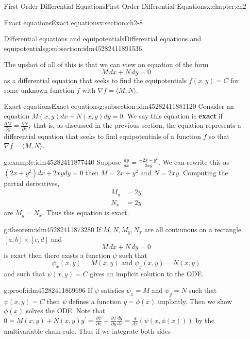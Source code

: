 \documentclass[oneside,10pt,]{book}
\newcommand{\terminology}[1]{\textbf{#1}}
\numberwithin{equation}{section}
\numberwithin{equation}{section}
\newcommand{\amp}{&}
\begin{document}
\begin{chapterptx}{First Order Differential Equations}{}{First Order Differential Equations}{}{}{x:chapter:ch2}
\begin{sectionptx}{Exact equations}{}{Exact equations}{}{}{x:section:ch2-8}
\begin{subsectionptx}{Differential equations and equipotentials}{}{Differential equations and equipotentials}{}{}{g:subsection:idm45282411891536}
\begin{equation*}
\end{equation*}
%
\par
The upshot of all of this is that we can view an equation of the form%
\begin{equation*}
M \, dx + N \, dy = 0
\end{equation*}
as a differential equation that seeks to find the equipotentials \(f(x,y) = C\) for some unknown function \(f\) with \(\nabla f = \langle M, N \rangle\).%
\end{subsectionptx}
%
%
\typeout{************************************************}
\typeout{************************************************}
%
\begin{subsectionptx}{Exact equations}{}{Exact equations}{}{}{g:subsection:idm45282411881120}
Consider an equation \(M(x,y)dx+N(x,y)dy=0.\) We say this equation is \terminology{exact} if \(\frac{\partial M}{\partial y}=\frac{\partial N}{\partial x};\) that is, as discussed in the previous section, the equation represents a differential equation that seeks to find equipotentials of a function \(f\) so that \(\nabla f = \langle M, N \rangle\).%
\begin{example}{}{g:example:idm45282411877440}%
Suppose \(\frac{dy}{dx}=\frac{-2x-y^{2}}{2xy}.\) We can rewrite this as \(\left(2x+y^{2}\right)dx+2xydy=0\) then \(M=2x+y^{2}\) and \(N=2xy\). Computing the partial derivatives,%
\begin{align*}
M_{y} \amp =2y\\
N_{x} \amp =2y
\end{align*}
are \(M_{y}=N_{x}\). Thus this equation is exact.\end{example}
\begin{theorem}{}{}{g:theorem:idm45282411873280}%
If \(M,N,M_{y},N_{x}\) are all continuous on a rectangle \([a,b]\times[c,d]\) and%
\begin{equation*}
M\,dx+N\,dy=0
\end{equation*}
is exact then there exists a function \(\psi\) such that%
\begin{equation*}
\psi_{x}(x,y)=M(x,y)\text{ and }\psi_{y}(x,y)=N(x,y)
\end{equation*}
and such that \(\psi(x,y)=C\) gives an implicit solution to the ODE.%
\end{theorem}
\begin{proofptx}{}{g:proof:idm45282411869696}
If \(\psi\) satisfies \(\psi_{x}=M\) and \(\psi_{y}=N\) such that \(\psi(x,y)=C\) then \(\psi\) defines a function \(y=\phi(x)\) implicitly. Then we show \(\phi(x)\) solves the ODE. Note that \(0=M(x,y)+N(x,y)y^{\prime}=\frac{\partial\psi}{\partial x}+\frac{\partial\psi}{\partial y}\frac{dy}{dx}=\frac{d}{dx}\left(\psi\left(x,\phi(x)\right)\right)\) by the multivariable chain rule. Thus if we integrate both sides%

\end{proofptx}
\end{subsectionptx}
\end{sectionptx}
\end{chapterptx}
\end{document}
